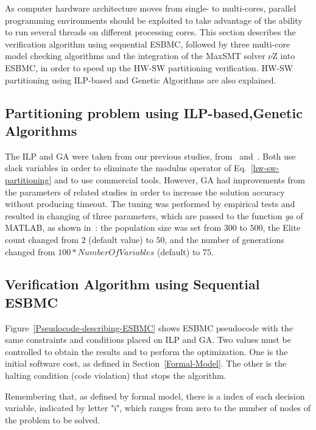 \documentclass{doublecol-new}
\theoremstyle{TH}{
\newtheorem{lemma}{Lemma}
\newtheorem{theorem}[lemma]{Theorem}
\newtheorem{corrolary}[lemma]{Corrolary}
\newtheorem{conjecture}[lemma]{Conjecture}
\newtheorem{proposition}[lemma]{Proposition}
\newtheorem{claim}[lemma]{Claim}
\newtheorem{stheorem}[lemma]{Wrong Theorem}
\newtheorem{algorithm}{Algorithm}
}
\theoremstyle{THrm}{
\newtheorem{definition}{Definition}[section]
\newtheorem{question}{Question}[section]
\newtheorem{remark}{Remark}
\newtheorem{scheme}{Scheme}
}
\theoremstyle{THhit}{
\newtheorem{case}{Case}[section]
}
\begin{document}
As computer hardware architecture moves from single- to multi-cores, parallel programming environments should be exploited to take advantage of the ability to run several threads on different processing cores. This section describes the verification algorithm using sequential ESBMC, followed by three multi-core model checking algorithms and the integration of the MaxSMT solver $\nu$Z into ESBMC, in order to speed up the HW-SW partitioning verification. HW-SW partitioning using ILP-based and Genetic Algorithms are also explained.

\subsection{Partitioning problem using ILP-based,Genetic Algorithms}
\label{ILPGA}

The ILP and GA were taken from our previous studies, from~\cite{Trindade2015} and~\cite{Trindade2016}. Both use slack variables in order to eliminate the modulus operator of Eq.~\eqref{hw-sw-partitioning} and to use commercial tools. However, GA had improvements from the parameters of related studies in order to increase the solution accuracy without producing timeout. The tuning was performed by empirical tests and resulted in changing of three parameters, which are passed to the function \textit{ga} of MATLAB, as shown in~\cite{TheMathWorks2013}: the population size was set from $300$ to $500$, the Elite count changed from $2$ (default value) to $50$, and the number of generations changed from $100*NumberOfVariables$ (default) to $75$.

\subsection{Verification Algorithm using Sequential ESBMC}
\label{Verification-Algorithm-using-ESBMC}

Figure~\ref{Pseudocode-describing-ESBMC} shows ESBMC pseudocode with the same constraints and conditions placed on ILP and GA. Two values must be controlled to obtain the results and to perform the optimization. One is the initial software cost, as defined in Section~\ref{Formal-Model}. The other is the halting condition (code violation) that stops the algorithm.

Remembering that, as defined by formal model, there is a index of each decision variable, indicated by letter "i", which ranges from zero to the number of nodes of the problem to be solved. 
\end{document}
